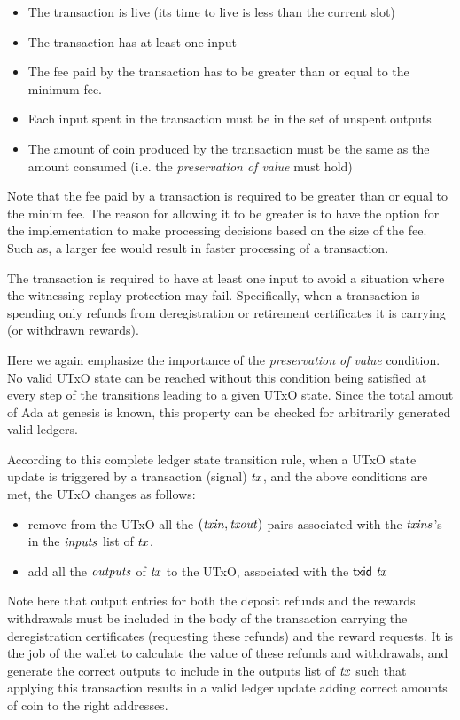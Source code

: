 \documentclass[11pt,a4paper,dvipsnames]{article}
\theoremstyle{definition}
\theoremstyle{definition}
\begin{document}
\begin{itemize}
\item The transaction is live (its time to live is less than the current slot)
\item The transaction has at least one input
\item The fee paid by the transaction has to be greater than or equal to the
minimum fee.
\item Each input spent in the transaction must be in the set of unspent
  outputs
\item The amount of coin produced by the transaction must be the same as
the amount consumed (i.e. the \textit{preservation of value} must hold)
\end{itemize}

Note that the fee paid by a transaction is required to be greater than or
equal to the minim fee. The reason for allowing it to be greater is to have
the option for the implementation to make processing decisions based on the
size of the fee. Such as, a larger fee would result in faster processing of
a transaction.

The transaction is required to have at least one input to avoid a situation
where the witnessing replay protection may fail. Specifically, when a transaction is
spending only refunds from deregistration or retirement certificates it is
carrying (or withdrawn rewards).

Here we again emphasize the importance of the \textit{preservation of value}
condition. No valid UTxO state can be reached without this condition
being satisfied at every step of the transitions leading to a given UTxO state.
Since the total amout of Ada at genesis is known, this property can be
checked for arbitrarily generated valid ledgers.

According to this complete ledger state transition rule, when a UTxO state update
is triggered by a
transaction (signal) $\mathit{tx}$, and the above conditions are met, the UTxO
changes as follows:

\begin{itemize}
\item remove from the UTxO all the $(\mathit{txin}, \mathit{txout})$ pairs
associated with the $\mathit{txins}$'s in the $\mathit{inputs}$ list of $\mathit{tx}$.
\item add all the $\mathit{outputs}$ of $\mathit{tx}$ to the
UTxO, associated with the $\mathsf{txid}~\mathit{tx}$
\end{itemize}

Note here that output entries for both the deposit refunds and the rewards
withdrawals must be included in the body of the transaction
carrying the deregistration certificates (requesting these refunds) and the
reward requests. It is the job
of the wallet to calculate the value of these refunds and withdrawals, and
generate the correct outputs to include in the outputs list of $\mathit{tx}$ such
that applying this transaction results in a
valid ledger update adding correct amounts of coin to the right addresses.
\end{document}
